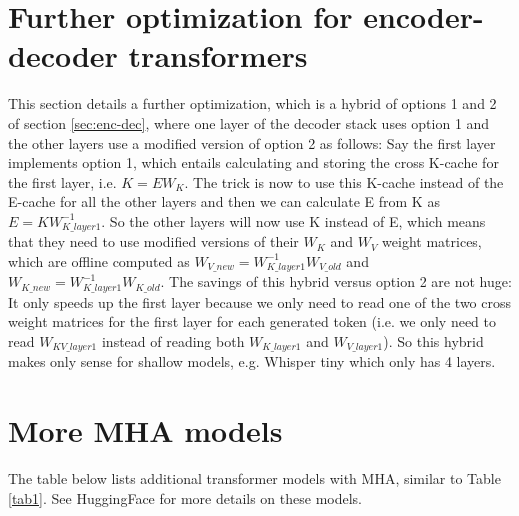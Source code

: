 \documentclass{article}
\begin{document}
\section{Further optimization for encoder-decoder transformers}
This section details a further optimization, which is a hybrid of options 1 and 2 of section \ref{sec:enc-dec}, where one layer of the decoder stack uses option 1 and the other layers use a modified version of option 2 as follows: Say the first layer implements option 1, which entails calculating and storing the cross K-cache for the first layer, i.e. $K = E W_K$. The trick is now to use this K-cache instead of the E-cache for all the other layers and then we can calculate E from K as $E = K W_{K\_layer1}^{-1}$. So the other layers will now use K instead of E, which means that they need to use modified versions of their $W_K$ and $W_V$ weight matrices, which are offline computed as $W_{V\_new} = W_{K\_layer1}^{-1} W_{V\_old}$ and $W_{K\_new} = W_{K\_layer1}^{-1} W_{K\_old}$. The savings of this hybrid versus option 2 are not huge: It only speeds up the first layer because we only need to read one of the two cross weight matrices for the first layer for each generated token (i.e. we only need to read $W_{KV\_layer1}$ instead of reading both $W_{K\_layer1}$ and $W_{V\_layer1}$). So this hybrid makes only sense for shallow models, e.g. Whisper tiny which only has 4 layers.

\section{More MHA models}
The table below lists additional transformer models with MHA, similar to Table \ref{tab1}. See HuggingFace for more details on these models.
\end{document}
